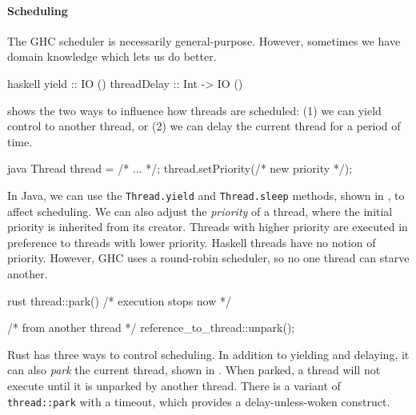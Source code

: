 \paragraph{Scheduling}
The GHC scheduler is necessarily general-purpose.  However, sometimes
we have domain knowledge which lets us do better.

\begin{listing}
\centering
\begin{cminted}{haskell}
yield       :: IO ()
threadDelay :: Int -> IO ()
\end{cminted}
\caption{Controlling thread scheduling in Haskell.}\label{lst:schedule_haskell}
\end{listing}

 shows the two ways to influence how
threads are scheduled: (1) we can yield control to another thread, or
(2) we can delay the current thread for a period of time.

\begin{listing}
\centering
\begin{cminted}{java}
Thread thread = /* ... */;
thread.setPriority(/* new priority */);
\end{cminted}
\caption{Thread priority in Java.}\label{lst:schedule_java}
\end{listing}

In Java, we can use the \verb|Thread.yield| and \verb|Thread.sleep|
methods, shown in , to affect scheduling.  We
can also adjust the \emph{priority} of a thread, where the initial
priority is inherited from its creator.  Threads with higher priority
are executed in preference to threads with lower priority.  Haskell
threads have no notion of priority.  However, GHC uses a round-robin
scheduler, so no one thread can starve another.

\begin{listing}[h!]
\centering
\begin{cminted}{rust}
thread::park() /* execution stops now */

/* from another thread */
reference_to_thread::unpark();
\end{cminted}
\caption{Thread parking and unparking in Rust.}\label{lst:schedule_rust}
\end{listing}

Rust has three ways to control scheduling.  In addition to yielding
and delaying, it can also \emph{park} the current thread, shown in
.  When parked, a thread will not execute
until it is unparked by another thread.  There is a variant of
\verb|thread::park| with a timeout, which provides a
delay-unless-woken construct.

